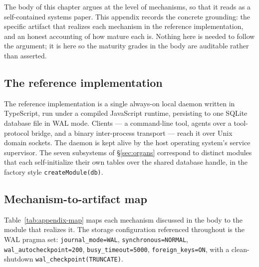 \documentclass[11pt,a4paper]{article}
\theoremstyle{definition}
\theoremstyle{remark}
\begin{document}
The body of this chapter argues at the level of mechanisms, so that it reads as a
self-contained systems paper. This appendix records the concrete grounding: the
specific artifact that realizes each mechanism in the reference implementation, and
an honest accounting of how mature each is. Nothing here is needed to follow the
argument; it is here so the maturity grades in the body are auditable rather than
asserted.

\subsection{The reference implementation}

The reference implementation is a single always-on local daemon written in
TypeScript, run under a compiled JavaScript runtime, persisting to one SQLite
database file in WAL mode. Clients --- a command-line tool, agents over a
tool-protocol bridge, and a binary inter-process transport --- reach it over Unix
domain sockets. The daemon is kept alive by the host operating system's service
supervisor. The seven subsystems of \S\ref{sec:organs} correspond to distinct modules
that each self-initialize their own tables over the shared database handle, in the
factory style \texttt{createModule(db)}.

\subsection{Mechanism-to-artifact map}

Table~\ref{tab:appendix-map} maps each mechanism discussed in the body to the
module that realizes it. The storage configuration referenced throughout is the WAL
pragma set: \texttt{journal\_mode=WAL}, \texttt{synchronous=NORMAL},
\texttt{wal\_autocheckpoint=200}, \texttt{busy\_timeout=5000},
\texttt{foreign\_keys=ON}, with a clean-shutdown \texttt{wal\_checkpoint(TRUNCATE)}.
\end{document}
